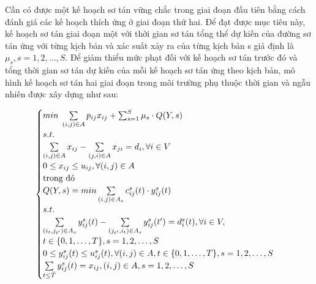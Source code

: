 \documentclass[a4paper]{article}
\begin{document}
    Cần có được một kế hoạch sơ tán vững chắc trong giai đoạn đầu tiên bằng cách đánh giá các kế hoạch thích ứng ở giai đoạn thứ hai.
    Để đạt được mục tiêu này, kế hoạch sơ tán giai đoạn một với thời gian sơ tán tổng thể dự kiến của đường sơ tán ứng với từng kịch bản và xác suất xảy ra của từng kịch bản s giả định là $\mu_s, s = 1,2, \dotsc, S.$
    Để giảm thiểu mức phạt đối với kế hoạch sơ tán trước đó và tổng thời gian sơ tán dự kiến của mỗi kế hoạch sơ tán ứng theo kịch bản, mô hình kế hoạch sơ tán hai giai đoạn trong môi trường phụ thuộc thời gian và ngẫu nhiên được xây dựng như sau:
    
    \begin{displaymath}
        \begin{cases}
            min \; \sum\limits_{(i,j) \in A} p_{ij}x_{ij} + \sum_{s=1}^{S} \mu_s \cdot Q(Y,s)\\
            s.t.\\
            \sum\limits_{(i,j) \in A} x_{ij} - \sum\limits_{(j,i) \in A} x_{ji} = d_i, \forall i \in V\\
            0 \leq x_{ij} \leq u_{ij}, \forall (i,j) \in A\\
            \text{trong đó}\\
            Q(Y,s) = min \sum\limits_{(i,j) \in A_s} c_{ij}^s(t) \cdot y_{ij}^s(t)\\
            s.t.\\
            \sum\limits_{(i_t,j_{t'}) \in A_s} y_{ij}^s(t) - \sum\limits_{(j_{t'},i_t) \in A_s} y_{ij}^s(t') = d_i^s(t), \forall i \in V,\\
            t \in \{0,1, \dotsc, T \}, s = 1, 2, \dots, S\\
            0 \leq y_{ij}^s(t) \leq u_{ij}^s(t), \forall (i,j) \in A, t \in \{0,1, \dotsc, T \}, s = 1, 2, \dots, S\\
            \sum\limits_{t \leq \Tilde{T}} y_{ij}^s(t) = x_{ij}, (i,j) \in A, s = 1, 2, \dots, S\\
        \end{cases} 
    \end{displaymath}
\end{document}
